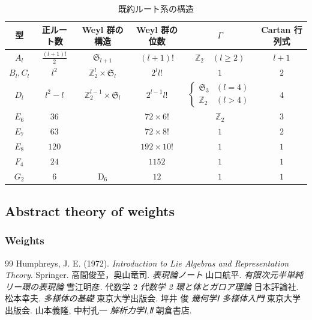 \documentclass[uplatex,dvipdfmx]{jsarticle}
\begin{document}
\begin{table}[htbp]
\centering
\caption{既約ルート系の構造}
\label{tab:irreducible_root_systems_image}
\begin{tabular}{cccccc}
\hline
型 & 正ルート数 & Weyl 群の構造 & Weyl 群の位数 & $\Gamma$ & Cartan 行列式 \\ \hline
$A_l$ & $\frac{(l+1)l}{2}$ & $\mathfrak{S}_{l+1}$ & $(l+1)!$ & $\mathbb{Z}_2 \quad (l \ge 2)$ & $l+1$ \\
$B_l, C_l$ & $l^2$ & $\mathbb{Z}_2^l \times \mathfrak{S}_l$ & $2^l l!$ & $1$ & $2$ \\
$D_l$ & $l^2 - l$ & $\mathbb{Z}_2^{l-1} \times \mathfrak{S}_l$ & $2^{l-1} l!$ & $\begin{cases} \mathfrak{S}_3 & (l=4) \\ \mathbb{Z}_2 & (l>4) \end{cases}$ & $4$ \\
$E_6$ & $36$ & & $72 \times 6!$ & $\mathbb{Z}_2$ & $3$ \\
$E_7$ & $63$ & & $72 \times 8!$ & $1$ & $2$ \\
$E_8$ & $120$ & & $192 \times 10!$ & $1$ & $1$ \\
$F_4$ & $24$ & & $1152$ & $1$ & $1$ \\ 
$G_2$ & $6$ & $\mathrm{D}_6$ & $12$ & $1$ & $1$ \\ \hline
\end{tabular}
\end{table}
\newpage
\subsection{Abstract theory of weights}

\subsubsection{Weights}





\newpage
\begin{thebibliography}{99}
     Humphreys, J. E. (1972). \textit{Introduction to Lie Algebras and Representation Theory}. Springer.
     高間俊至，奥山竜司. \textit{表現論ノート}
     山口航平. \textit{有限次元半単純リー環の表現論}
     雪江明彦. 代数学 2 \textit{代数学 2 環と体とガロア理論} 日本評論社.
     松本幸夫. \textit{多様体の基礎} 東京大学出版会.
     坪井 俊 \textit{幾何学Ⅰ 多様体入門} 東京大学出版会.
     山本義隆, 中村孔一 \textit{解析力学Ⅰ,Ⅱ} 朝倉書店.
\end{thebibliography}
\end{document}
